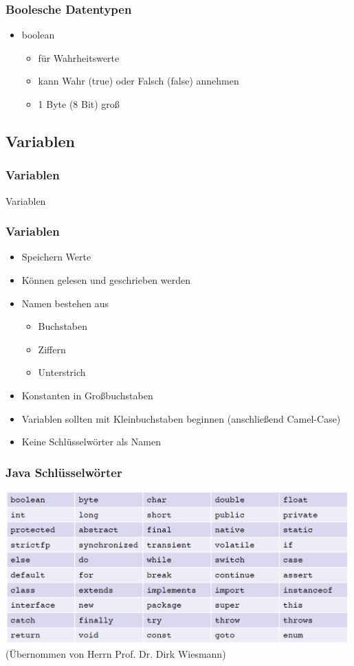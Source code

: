 \begin{frame}[fragile]
	\frametitle{Boolesche Datentypen}
			\begin{itemize}
			  \item boolean
			  \begin{itemize}
			    \item für Wahrheitswerte
			    \item kann Wahr (true) oder Falsch (false) annehmen
			  	\item 1 Byte (8 Bit) groß
			  \end{itemize}
			\end{itemize}
\end{frame}

\subsection{Variablen}
\begin{frame}[fragile]
	\frametitle{Variablen}
	\huge Variablen
\end{frame}

\begin{frame}[fragile]
	\frametitle{Variablen}
	\begin{itemize}
	  \item Speichern Werte
	  \item Können gelesen und geschrieben werden
	  \item Namen bestehen aus
	  \begin{itemize}
	  	\item Buchstaben
	  	\item Ziffern  
	  	\item Unterstrich
	  \end{itemize}
	  \item Konstanten in Großbuchstaben
	  \item Variablen sollten mit Kleinbuchstaben beginnen (anschließend
	  Camel-Case)
	  \item Keine Schlüsselwörter als Namen
	\end{itemize}
\end{frame}

\begin{frame}[fragile]
	\frametitle{Java Schlüsselwörter}
	\center
	\includegraphics[width=0.99\textwidth,
	keepaspectratio=true]{bilder/keywords.png}\\
	\tiny (Übernommen von Herrn Prof. Dr. Dirk Wiesmann)
\end{frame}

